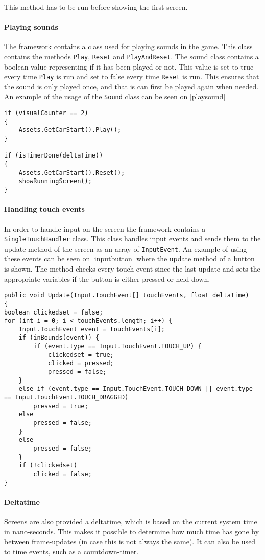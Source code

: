 This method has to be run before showing the first screen.

\paragraph{Playing sounds}
The framework contains a class used for playing sounds in the game. 
This class contains the methods \lstinline|Play|, \lstinline|Reset| and \lstinline|PlayAndReset|.
The sound class contains a boolean value representing if it has been played or not. 
This value is set to true every time \lstinline|Play| is run and set to false every time \lstinline|Reset| is run.
This ensures that the sound is only played once, and that is can first be played again when needed.
An example of the usage of the \lstinline|Sound| class can be seen on \cref{playsound}

\begin{lstlisting}[caption=Playing a sound, label=playsound]
if (visualCounter == 2) 
{
	Assets.GetCarStart().Play();
}

if (isTimerDone(deltaTime)) 
{
	Assets.GetCarStart().Reset();
	showRunningScreen();
}
\end{lstlisting}

\paragraph{Handling touch events}
In order to handle input on the screen the framework contains a \lstinline|SingleTouchHandler| class.
This class handles input events and sends them to the update method of the screen as an array of \lstinline|InputEvent|.
An example of using these events can be seen on \cref{inputbutton} where the update method of a button is shown. 
The method checks every touch event since the last update and sets the appropriate variables if the button is either pressed or held down.

\begin{lstlisting}[caption=Implementation of an ingame button, label=inputbutton]
public void Update(Input.TouchEvent[] touchEvents, float deltaTime) 
{
boolean clickedset = false;
for (int i = 0; i < touchEvents.length; i++) {
	Input.TouchEvent event = touchEvents[i];
	if (inBounds(event)) {
		if (event.type == Input.TouchEvent.TOUCH_UP) {
			clickedset = true;
			clicked = pressed;
			pressed = false;
	}
	else if (event.type == Input.TouchEvent.TOUCH_DOWN || event.type == Input.TouchEvent.TOUCH_DRAGGED)
		pressed = true;
	else
		pressed = false;
	} 
	else
		pressed = false;
	}
	if (!clickedset)
		clicked = false;
}
\end{lstlisting}

\paragraph{Deltatime}
Screens are also provided a deltatime, which is based on the current system time in nano-seconds.
This makes it possible to determine how much time has gone by between frame-updates (in case this is not always the same).
It can also be used to time events, such as a countdown-timer.